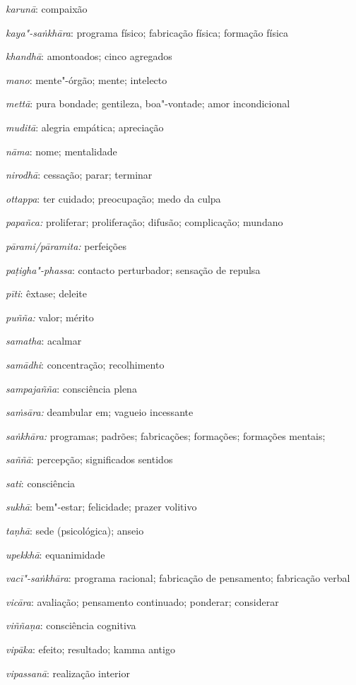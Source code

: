 \begin{glossarydescription}
  \emph{karunā}: compaixão

  \emph{kaya"-saṅkhāra}: programa físico; fabricação física; formação física

  \emph{khandhā}: amontoados; cinco agregados

  \emph{mano}: mente"-órgão; mente; intelecto

  \emph{mettā}: pura bondade; gentileza, boa"-vontade; amor incondicional

  \emph{muditā}: alegria empática; apreciação

  \emph{nāma}: nome; mentalidade

  \emph{nirodhā}: cessação; parar; terminar

  \emph{ottappa}: ter cuidado; preocupação; medo da culpa

  \emph{papañca:} proliferar; proliferação; difusão; complicação; mundano

  \emph{pārami/pāramita:} perfeições

  \emph{paṭigha"-phassa}: contacto perturbador; sensação de repulsa

  \emph{pīti}: êxtase; deleite

  \emph{puñña:} valor; mérito

  \emph{samatha}: acalmar

  \emph{samādhi}: concentração; recolhimento

  \emph{sampajañña}: consciência plena

  \emph{saṁsāra:} deambular em; vagueio incessante

  \emph{saṅkhāra:} programas; padrões; fabricações; formações; formações mentais;

  \emph{saññā}: percepção; significados sentidos

  \emph{sati}: consciência

  \emph{sukhā}: bem"-estar; felicidade; prazer volitivo

  \emph{taṇhā}: sede (psicológica); anseio

  \emph{upekkhā}: equanimidade

  \emph{vacī"-saṅkhāra}: programa racional; fabricação de pensamento; fabricação verbal

  \emph{vicāra}: avaliação; pensamento continuado; ponderar; considerar

  \emph{viññaṇa}: consciência cognitiva

  \emph{vipāka}: efeito; resultado; kamma antigo

  \emph{vipassanā}: realização interior


\end{glossarydescription}
